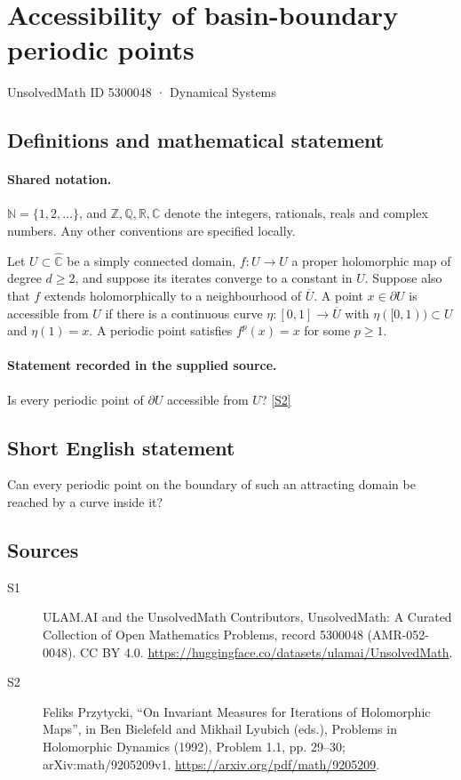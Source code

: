 \documentclass[11pt]{article}
\newcommand{\sref}[2]{\hyperlink{source:#1:#2}{[S#2]}}
\begin{document}
\setcounter{section}{5300047}
\section{Accessibility of basin-boundary periodic points}\label{5300048}
{\small\sffamily UnsolvedMath ID 5300048 · Dynamical Systems}
\subsection{Definitions and mathematical statement}

\paragraph{Shared notation.}$\mathbb N=\{1,2,\ldots\}$, and $\mathbb Z,\mathbb Q,\mathbb R,\mathbb C$ denote the integers, rationals, reals and complex numbers. Any other conventions are specified locally.


Let $U\subset\widehat{\mathbb C}$ be a simply connected domain, $f:U\to U$ a proper holomorphic map of degree $d\geq2$, and suppose its iterates converge to a constant in $U$. Suppose also that $f$ extends holomorphically to a neighbourhood of $\overline U$. A point $x\in\partial U$ is accessible from $U$ if there is a continuous curve $\eta:[0,1]\to\overline U$ with $\eta([0,1))\subset U$ and $\eta(1)=x$. A periodic point satisfies $f^p(x)=x$ for some $p\geq1$.
\paragraph{Statement recorded in the supplied source.}
Is every periodic point of $\partial U$ accessible from $U$? \sref{5300048}{2}
\subsection{Short English statement}
Can every periodic point on the boundary of such an attracting domain be reached by a curve inside it?
\subsection{Sources}
\begin{description}
\item[\hypertarget{source:5300048:1}{S1}] ULAM.AI and the UnsolvedMath Contributors, UnsolvedMath: A Curated Collection of Open Mathematics Problems, record 5300048 (AMR-052-0048). CC BY 4.0. \url{https://huggingface.co/datasets/ulamai/UnsolvedMath}.
\item[\hypertarget{source:5300048:2}{S2}] Feliks Przytycki, ``On Invariant Measures for Iterations of Holomorphic Maps'', in Ben Bielefeld and Mikhail Lyubich (eds.), Problems in Holomorphic Dynamics (1992), Problem 1.1, pp. 29--30; arXiv:math/9205209v1. \url{https://arxiv.org/pdf/math/9205209}.
\end{description}
\label{end:5300048}
\end{document}
